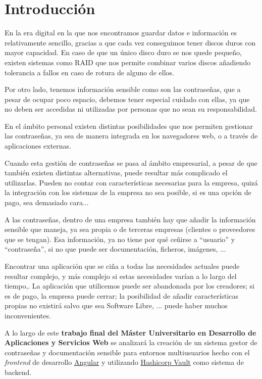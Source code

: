 \documentclass{\ClassPath/viu-tfm-template}
\begin{document}
\tableofcontents


\chapter{Introducción}
En la era digital en la que nos encontramos guardar datos e información es relativamente sencillo, gracias a que cada vez conseguimos tener discos duros con mayor capacidad. En caso de que un único disco duro se nos quede pequeño, existen sistemas como RAID que nos permite combinar varios discos añadiendo tolerancia a fallos en caso de rotura de alguno de ellos.

Por otro lado, tenemos información sensible como son las contraseñas, que a pesar de ocupar poco espacio, debemos tener especial cuidado con ellas, ya que no deben ser accedidas ni utilizadas por personas que no sean su responsabilidad.

En el ámbito personal existen distintas posibilidades que nos permiten gestionar las contraseñas, ya sea de manera integrada en los navegadores web, o a través de aplicaciones externas.

Cuando esta gestión de contraseñas se pasa al ámbito empresarial, a pesar de que también existen distintas alternativas, puede resultar más complicado el utilizarlas. Pueden no contar con características necesarias para la empresa, quizá la integración con los sistemas de la empresa no sea posible, si es una opción de pago, sea demasiado cara...

A las contraseñas, dentro de una empresa también hay que añadir la información sensible que maneja, ya sea propia o de terceras empresas (clientes o proveedores que se tengan). Esa información, ya no tiene por qué ceñirse a “usuario” y “contraseña”, si no que puede ser documentación, ficheros, imágenes, ...

Encontrar una aplicación que se ciña a todas las necesidades actuales puede resultar complejo, y más complejo si estas necesidades varían a lo largo del tiempo,. La aplicación que utilicemos puede ser abandonada por los creadores; si es de pago, la empresa puede cerrar; la posibilidad de añadir características propias no existirá salvo que sea Software Libre, ... puede haber muchos inconvenientes.

A lo largo de este \textbf{trabajo final del Máster Universitario en Desarrollo de Aplicaciones y Servicios Web} se analizará la creación de un sistema gestor de contraseñas y documentación sensible para entornos multiusuarios hecho con el \textit{frontend} de desarrollo \href{https://angular.io/}{Angular} y utilizando  \href{https://www.vaultproject.io/}{Hashicorp Vault} como sistema de backend.
\end{document}
